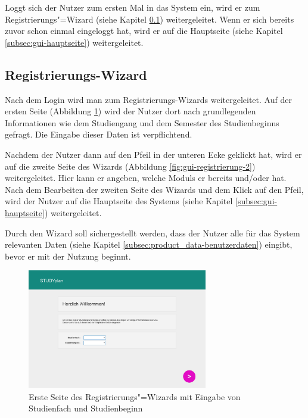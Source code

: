 Loggt sich der Nutzer zum ersten Mal in das System ein, wird er zum Registrierungs"=\gls{Wizard} (siehe Kapitel \ref{subsec:gui-registrierung}) weitergeleitet. Wenn er sich bereits zuvor schon einmal eingeloggt hat, wird er auf die Hauptseite (siehe Kapitel \ref{subsec:gui-hauptseite}) weitergeleitet.
\subsection{Registrierungs-Wizard}
\label{subsec:gui-registrierung}
Nach dem Login wird man zum Registrierungs-\gls{Wizard}s weitergeleitet. Auf der ersten Seite (Abbildung \ref{fig:gui-registrierung-1}) wird der Nutzer dort nach grundlegenden Informationen wie dem \gls{Studiengang} und dem \gls{Semester des Studienbeginns} gefragt. Die Eingabe dieser Daten ist verpflichtend.

Nachdem der Nutzer dann auf den Pfeil in der unteren Ecke geklickt hat, wird er auf die zweite Seite des \gls{Wizard}s (Abbildung \ref{fig:gui-registrierung-2}) weitergeleitet. Hier kann er angeben, welche \glspl{Modul} er bereits  und/oder  hat. 
Nach dem Bearbeiten der zweiten Seite des \gls{Wizard}s und dem Klick auf den Pfeil, wird der Nutzer auf die Hauptseite des Systems (siehe Kapitel \ref{subsec:gui-hauptseite}) weitergeleitet.

Durch den \gls{Wizard} soll sichergestellt werden, dass der Nutzer alle für das System relevanten Daten (siehe Kapitel \ref{subsec:product_data-benutzerdaten}) eingibt, bevor er mit der Nutzung beginnt.
\begin{figure}[!htb]
	\caption{Erste Seite des Registrierungs"=\gls{Wizard}s mit Eingabe von Studienfach und Studienbeginn}
	\label{fig:gui-registrierung-1}
	\centering
	\includegraphics[width=0.7\textwidth]{../GUI/ergebnisse/registrierung-1.png}
\end{figure}

